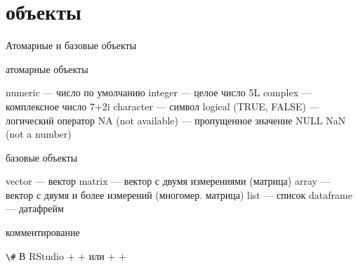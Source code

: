 \section{объекты}
\begin{frame}{Атомарные и базовые объекты}
\begin{itemize}
\mytem атомарные объекты
\begin{itemize}
\mytem numeric — число \hfill по умолчанию
\mytem integer — целое число \hfill  5L
\mytem complex  — комплексное число \hfill 7+2i
\mytem character  — символ
\mytem logical (TRUE, FALSE) — логический оператор
\mytem NA (not available) — пропущенное значение
\mytem NULL
\mytem NaN (not a number)
\end{itemize}
\mytem базовые объекты
\begin{itemize}
\mytem vector — вектор \hfill{\color{red!13!blue}{объекты только одного класса}}
\mytem matrix — вектор с двумя измерениями (матрица)
\mytem array — вектор с двумя и более измерений (многомер. матрица)
\mytem list — список \hfill{\color{red!13!blue}{может содержать объекты разного класса}}
\mytem dataframe — датафрейм
\end{itemize}
\mytem комментирование
\begin{itemize}
\mytem \footnotesize\verb"\#"\normalsize
\mytem В RStudio  +  +  или  +  + 
\end{itemize}
\end{itemize}
\end{frame}
